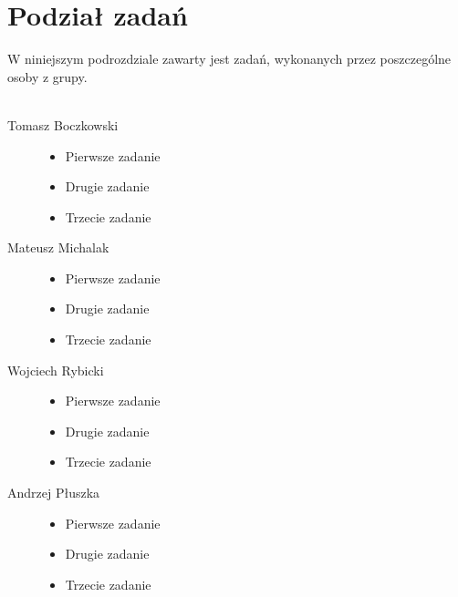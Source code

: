 \section{Podział zadań}
W niniejszym podrozdziale zawarty jest zadań, wykonanych przez poszczególne osoby z grupy.\\\\
\begin{description}
  \item[Tomasz Boczkowski] \hfill 
  \begin{itemize}
\item Pierwsze zadanie
\item Drugie zadanie
\item Trzecie zadanie
\end{itemize}
  \item[Mateusz Michalak] \hfill 
    \begin{itemize}
\item Pierwsze zadanie
\item Drugie zadanie
\item Trzecie zadanie
\end{itemize}
  \item[Wojciech Rybicki] \hfill 
    \begin{itemize}
\item Pierwsze zadanie
\item Drugie zadanie
\item Trzecie zadanie
\end{itemize}
  \item[Andrzej Płuszka] \hfill 
    \begin{itemize}
\item Pierwsze zadanie
\item Drugie zadanie
\item Trzecie zadanie
\end{itemize}
\end{description}




